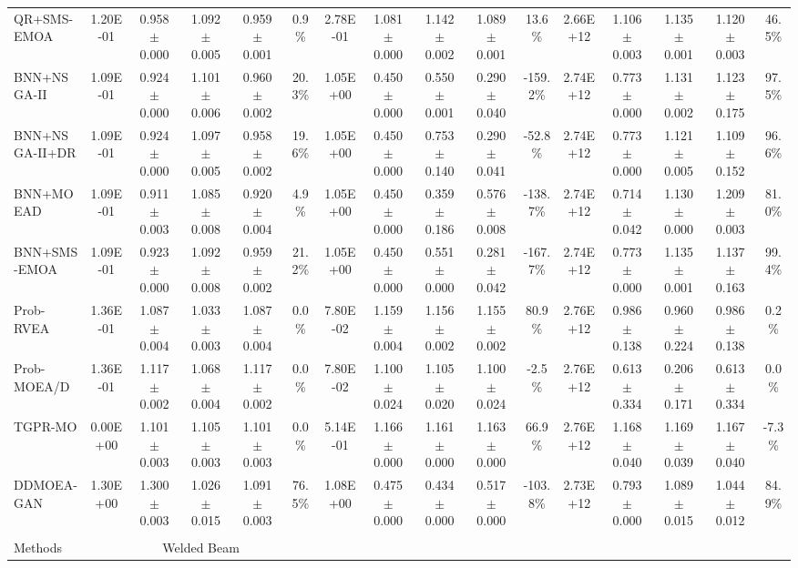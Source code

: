 \begin{table}[htbp]
{\begin{tabular}{l c c c c c c c c c c c c c c c}
QR+SMS-EMOA & 1.20E-01 & 0.958$\pm$0.000 & 1.092$\pm$0.005 & 0.959$\pm$0.001 & 0.9\% & 2.78E-01 & 1.081$\pm$0.000 & 1.142$\pm$0.002 & 1.089$\pm$0.001 & 13.6\% & 2.66E+12 & 1.106$\pm$0.003 & 1.135$\pm$0.001 & 1.120$\pm$0.003 & 46.5\% \\
BNN+NSGA-II & 1.09E-01 & 0.924$\pm$0.000 & 1.101$\pm$0.006 & 0.960$\pm$0.002 & 20.3\% & 1.05E+00 & 0.450$\pm$0.000 & 0.550$\pm$0.001 & 0.290$\pm$0.040 & -159.2\% & 2.74E+12 & 0.773$\pm$0.000 & 1.131$\pm$0.002 & 1.123$\pm$0.175 & 97.5\% \\
BNN+NSGA-II+DR & 1.09E-01 & 0.924$\pm$0.000 & 1.097$\pm$0.005 & 0.958$\pm$0.002 & 19.6\% & 1.05E+00 & 0.450$\pm$0.000 & 0.753$\pm$0.140 & 0.290$\pm$0.041 & -52.8\% & 2.74E+12 & 0.773$\pm$0.000 & 1.121$\pm$0.005 & 1.109$\pm$0.152 & 96.6\% \\
BNN+MOEAD & 1.09E-01 & 0.911$\pm$0.003 & 1.085$\pm$0.008 & 0.920$\pm$0.004 & 4.9\% & 1.05E+00 & 0.450$\pm$0.000 & 0.359$\pm$0.186 & 0.576$\pm$0.008 & -138.7\% & 2.74E+12 & 0.714$\pm$0.042 & 1.130$\pm$0.000 & 1.209$\pm$0.003 & 81.0\% \\
BNN+SMS-EMOA & 1.09E-01 & 0.923$\pm$0.000 & 1.092$\pm$0.008 & 0.959$\pm$0.002 & 21.2\% & 1.05E+00 & 0.450$\pm$0.000 & 0.551$\pm$0.000 & 0.281$\pm$0.042 & -167.7\% & 2.74E+12 & 0.773$\pm$0.000 & 1.135$\pm$0.001 & 1.137$\pm$0.163 & 99.4\% \\
Prob-RVEA & 1.36E-01 & 1.087$\pm$0.004 & 1.033$\pm$0.003 & 1.087$\pm$0.004 & 0.0\% & 7.80E-02 & 1.159$\pm$0.004 & 1.156$\pm$0.002 & 1.155$\pm$0.002 & 80.9\% & 2.76E+12 & 0.986$\pm$0.138 & 0.960$\pm$0.224 & 0.986$\pm$0.138 & 0.2\% \\
Prob-MOEA/D & 1.36E-01 & 1.117$\pm$0.002 & 1.068$\pm$0.004 & 1.117$\pm$0.002 & 0.0\% & 7.80E-02 & 1.100$\pm$0.024 & 1.105$\pm$0.020 & 1.100$\pm$0.024 & -2.5\% & 2.76E+12 & 0.613$\pm$0.334 & 0.206$\pm$0.171 & 0.613$\pm$0.334 & 0.0\% \\
TGPR-MO & 0.00E+00 & 1.101$\pm$0.003 & 1.105$\pm$0.003 & 1.101$\pm$0.003 & 0.0\% & 5.14E-01 & 1.166$\pm$0.000 & 1.161$\pm$0.000 & 1.163$\pm$0.000 & 66.9\% & 2.76E+12 & 1.168$\pm$0.040 & 1.169$\pm$0.039 & 1.167$\pm$0.040 & -7.3\% \\
DDMOEA-GAN & 1.30E+00 & 1.300$\pm$0.003 & 1.026$\pm$0.015 & 1.091$\pm$0.003 & 76.5\% & 1.08E+00 & 0.475$\pm$0.000 & 0.434$\pm$0.000 & 0.517$\pm$0.000 & -103.8\% & 2.73E+12 & 0.793$\pm$0.000 & 1.089$\pm$0.015 & 1.044$\pm$0.012 & 84.9\% \\
\hline
\multicolumn{16}{c}{} \\
\hline
Methods & \multicolumn{5}{c}{Welded Beam} & \multicolumn{5}{c}{} & \multicolumn{5}{c}{} \\

\end{tabular}}
\end{table}
